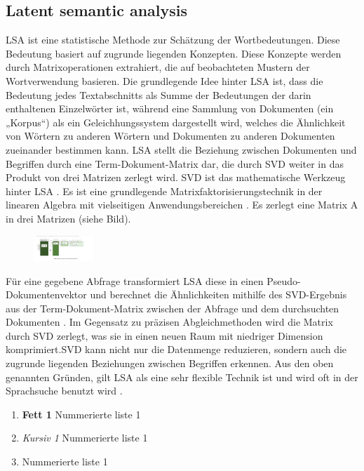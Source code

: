 \subsection{Latent semantic analysis}
\ac{LSA} ist eine statistische Methode zur Schätzung der Wortbedeutungen. Diese Bedeutung basiert auf zugrunde liegenden Konzepten. Diese Konzepte werden durch Matrixoperationen extrahiert, die auf beobachteten Mustern der Wortverwendung basieren.
Die grundlegende Idee hinter LSA ist, dass die Bedeutung jedes Textabschnitts als Summe der Bedeutungen der darin enthaltenen Einzelwörter ist, 
während eine Sammlung von Dokumenten (ein „Korpus“) als ein Geleichhungssystem dargestellt wird, welches die Ähnlichkeit von Wörtern zu anderen Wörtern und Dokumenten zu anderen Dokumenten zueinander bestimmen kann.
LSA stellt die Beziehung zwischen Dokumenten und Begriffen durch eine Term-Dokument-Matrix dar, die durch \ac{SVD} weiter in das Produkt von drei Matrizen zerlegt wird. SVD ist das mathematische Werkzeug hinter LSA \cite{TheUseofLatentSemanticAnalysis}. Es ist eine grundlegende 
Matrixfaktorisierungstechnik in der linearen Algebra mit vielseitigen Anwendungsbereichen \cite{Paige1981Towards}. Es zerlegt eine Matrix A in drei Matrizen (siehe Bild).
\begin{figure}[h]
    \centering
    \includegraphics[width=0.2\textwidth]{../images/SVD.png}
    \label{fig:SVD}
\end{figure}
Für eine gegebene Abfrage transformiert LSA diese in einen Pseudo-Dokumentenvektor und berechnet die Ähnlichkeiten mithilfe des SVD-Ergebnis aus der Term-Dokument-Matrix zwischen 
der Abfrage und dem durchsuchten Dokumenten \cite{SystematicReviewofSemanticAnalysisMethods_2023} .
Im Gegensatz zu präzisen Abgleichmethoden wird die Matrix durch SVD zerlegt, was sie in einen neuen Raum mit niedriger Dimension komprimiert.SVD kann nicht nur die Datenmenge reduzieren, sondern auch die zugrunde liegenden Beziehungen zwischen Begriffen erkennen. 
Aus den oben genannten Gründen, gilt LSA als eine sehr flexible Technik ist und wird oft in der Sprachsuche benutzt wird 
\cite{TextMiningUsingLatentSemanticAnalysis}.

\begin{enumerate}
    \item \textbf{Fett 1} Nummerierte liste 1
    \item \textit{Kursiv 1} Nummerierte liste 1
    \item Nummerierte liste 1
\end{enumerate}


